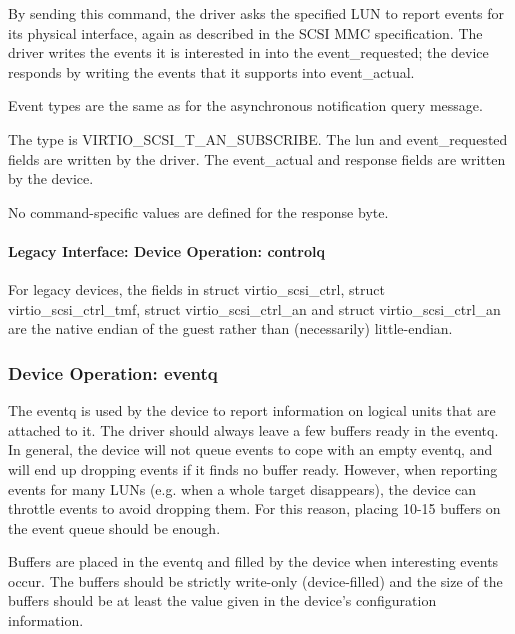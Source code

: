   By sending this command, the driver asks the specified LUN to
  report events for its physical interface, again as described in
  the SCSI MMC specification. The driver writes the events it is
  interested in into the event_requested; the device responds by
  writing the events that it supports into event_actual.

  Event types are the same as for the asynchronous notification
  query message.

  The type is VIRTIO_SCSI_T_AN_SUBSCRIBE. The lun and
  event_requested fields are written by the driver. The
  event_actual and response fields are written by the device.

  No command-specific values are defined for the response byte.

\paragraph{Legacy Interface: Device Operation: controlq}\label{sec:Device Types / SCSI Host Device / Device Operation / Device Operation: controlq / Legacy Interface: Device Operation: controlq}

For legacy devices, the fields in struct virtio_scsi_ctrl, struct
virtio_scsi_ctrl_tmf, struct virtio_scsi_ctrl_an and struct
virtio_scsi_ctrl_an are the native endian of the guest rather than
(necessarily) little-endian.


\subsubsection{Device Operation: eventq}\label{sec:Device Types / SCSI Host Device / Device Operation / Device Operation: eventq}

The eventq is used by the device to report information on logical
units that are attached to it. The driver should always leave a
few buffers ready in the eventq. In general, the device will not
queue events to cope with an empty eventq, and will end up
dropping events if it finds no buffer ready. However, when
reporting events for many LUNs (e.g. when a whole target
disappears), the device can throttle events to avoid dropping
them. For this reason, placing 10-15 buffers on the event queue
should be enough.

Buffers are placed in the eventq and filled by the device when
interesting events occur. The buffers should be strictly
write-only (device-filled) and the size of the buffers should be
at least the value given in the device's configuration
information.


